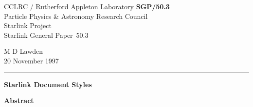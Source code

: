 \documentclass[twoside,11pt]{article}
\newcommand{\stardoccategory}  {Starlink General Paper}
\newcommand{\stardocinitials}  {SGP}
\newcommand{\stardocnumber}    {50.3}
\newcommand{\stardocauthors}   {M D Lawden}
\newcommand{\stardocdate}      {20 November 1997}
\newcommand{\stardoctitle}     {Starlink Document Styles}
\newcommand{\stardocname}{\stardocinitials /\stardocnumber}
\newenvironment{latexonly}{}{}
\begin{document}
\thispagestyle{empty}



\begin{latexonly}
   CCLRC / {\sc Rutherford Appleton Laboratory} \hfill {\bf \stardocname}\\
   {\large Particle Physics \& Astronomy Research Council}\\
   {\large Starlink Project}\\
   {\large \stardoccategory\ \stardocnumber}
   \begin{flushright}
   \stardocauthors\\
   \stardocdate
   \end{flushright}
   \vspace{-4mm}
   \rule{\textwidth}{0.5mm}
   \vspace{5mm}
   \begin{center}
   {\Huge\bf  \stardoctitle \\ [2.5ex]}

   \end{center}
   \vspace{5mm}




   \vspace{10mm}
   \begin{center}
      {\Large\bf Abstract}
   \end{center}


\end{latexonly}
\end{document}

